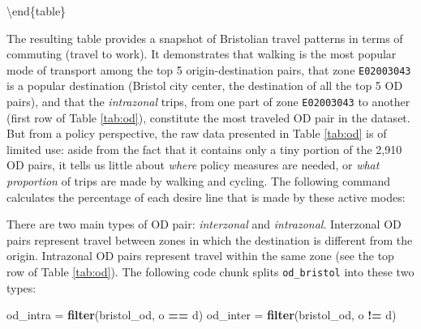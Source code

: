 \documentclass[]{krantz}
\newenvironment{Shaded}{\begin{snugshade}}{\end{snugshade}}
\newcommand{\DecValTok}[1]{\textcolor[rgb]{0.06,0.06,0.06}{#1}}
\newcommand{\KeywordTok}[1]{\textcolor[rgb]{0.27,0.27,0.27}{\textbf{#1}}}
\newcommand{\NormalTok}[1]{#1}
\newcommand{\OperatorTok}[1]{\textcolor[rgb]{0.43,0.43,0.43}{\textbf{#1}}}
\newcommand{\StringTok}[1]{\textcolor[rgb]{0.5,0.5,0.5}{#1}}
\begin{document}
\textbackslash{}end\{table\}

The resulting table provides a snapshot of Bristolian travel patterns in terms of commuting (travel to work).
It demonstrates that walking is the most popular mode of transport among the top 5 origin-destination pairs, that zone \texttt{E02003043} is a popular destination (Bristol city center, the destination of all the top 5 OD pairs), and that the \emph{intrazonal} trips, from one part of zone \texttt{E02003043} to another (first row of Table \ref{tab:od}), constitute the most traveled OD pair in the dataset.
But from a policy perspective, the raw data presented in Table \ref{tab:od} is of limited use:
aside from the fact that it contains only a tiny portion of the 2,910 OD pairs, it tells us little about \emph{where} policy measures are needed, or \emph{what proportion} of trips are made by walking and cycling.
The following command calculates the percentage of each desire line that is made by these active modes:

\begin{Shaded}
\end{Shaded}

There are two main types of OD pair:
\emph{interzonal} and \emph{intrazonal}.
Interzonal OD pairs represent travel between zones in which the destination is different from the origin.
Intrazonal OD pairs represent travel within the same zone (see the top row of Table \ref{tab:od}).
The following code chunk splits \texttt{od\_bristol} into these two types:

\begin{Shaded}
\begin{Highlighting}[]
\NormalTok{od_intra =}\StringTok{ }\KeywordTok{filter}\NormalTok{(bristol_od, o }\OperatorTok{==}\StringTok{ }\NormalTok{d)}
\NormalTok{od_inter =}\StringTok{ }\KeywordTok{filter}\NormalTok{(bristol_od, o }\OperatorTok{!=}\StringTok{ }\NormalTok{d)}
\end{Highlighting}
\end{Shaded}
\end{document}
